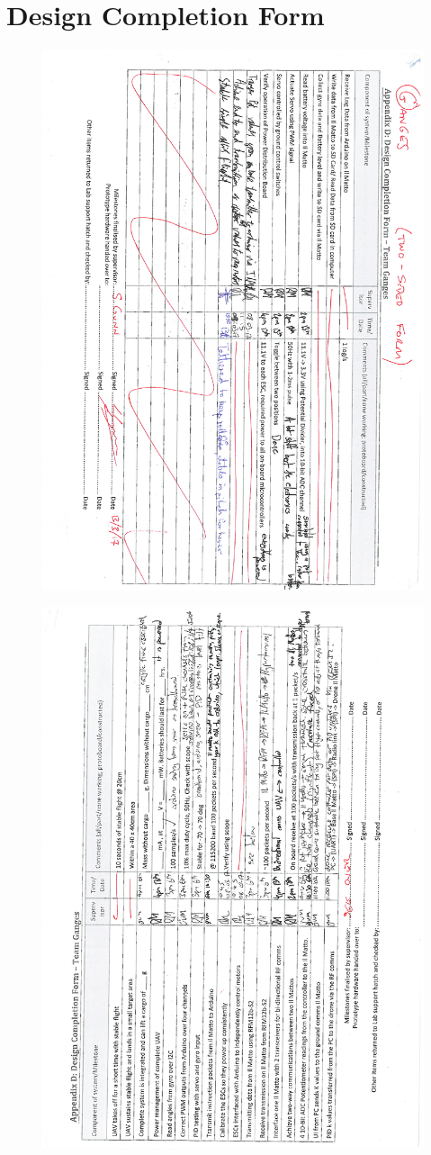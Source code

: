 \documentclass[a4paper,11pt]{article}
\begin{document}
\section{Design Completion Form}
\begin{figure}[!htp]
\centering
\includegraphics[height=0.9\textwidth,angle=90]{Design_Completion1.pdf}
\end{figure}
\FloatBarrier
\begin{figure}[!htp]
\centering
\includegraphics[height=0.9\textwidth,angle=-90]{Design_Completion2.pdf}
\end{figure}
\FloatBarrier
\newpage
\end{document}
